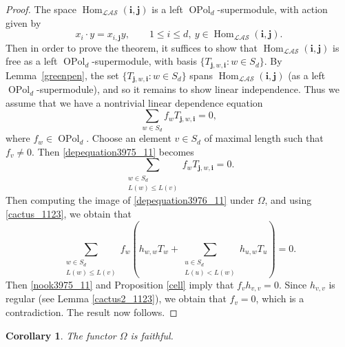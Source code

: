\documentclass[11pt]{amsart}
\newtheorem{cor}[theo]{Corollary}
\theoremstyle{definition}
\numberwithin{equation}{section}
\begin{document}
\begin{proof}
The space $ \operatorname{Hom}_{\mathcal{LAS}}(\mathbf{i}, \mathbf{j}) $ is a left $ \operatorname{OPol}_{d} $-supermodule, with action given by 
\begin{equation*}
x_{i} \cdot y = x_{i,\mathbf{j}}y, \qquad 1 \leq i \leq d, \ y \in  \operatorname{Hom}_{\mathcal{LAS}}(\mathbf{i}, \mathbf{j}).
\end{equation*}
Then in order to prove the theorem, it suffices to show that $ \operatorname{Hom}_{\mathcal{LAS}}(\mathbf{i}, \mathbf{j}) $ is free as a left $ \operatorname{OPol}_{d} $-supermodule, with basis $ \{T_{\mathbf{j},w,\mathbf{i}} : w \in S_{d}\} $. By Lemma~\ref{greenpen}, the set $ \{T_{\mathbf{j},w,\mathbf{i}} : w \in S_{d}\} $ spans $ \operatorname{Hom}_{\mathcal{LAS}}(\mathbf{i}, \mathbf{j}) $ (as a left $ \operatorname{OPol}_{d} $-supermodule), and so it remains to show linear independence. Thus we assume that we have a nontrivial linear dependence equation
\begin{equation} \label{depequation3975_11}
\sum_{w \in S_{d}} f_{w}T_{\mathbf{j},w,\mathbf{i}} = 0,
\end{equation}
where $ f_{w} \in \operatorname{OPol}_{d} $. Choose an element $ v \in S_{d} $ of maximal length such that $ f_{v} \neq 0 $. Then \cref{depequation3975_11} becomes
\begin{equation} \label{depequation3976_11}
\sum_{\substack{w \in S_{d} \\ L(w) \leq L(v)}} f_{w}T_{\mathbf{j},w,\mathbf{i}} = 0.
\end{equation}
Then computing the image of \cref{depequation3976_11} under $ \Omega $, and using \cref{cactus_1123}, we obtain that
\begin{equation} \label{nook3975_11}
\sum_{\substack{w \in S_{d} \\ L(w) \leq L(v)}} f_{w}\left( h_{w,w}T_{w} + \sum_{\substack{u \in S_{d} \\ L(u) < L(w)}} h_{u,w}T_{u}\right) = 0.
\end{equation}
Then \cref{nook3975_11} and Proposition \ref{cell} imply that $ f_{v}h_{v,v} = 0 $. Since $ h_{v,v} $ is regular (see Lemma \ref{cactus2_1123}), we obtain that $ f_{v} = 0 $, which is a contradiction. The result now follows.
\end{proof}

\begin{cor} \label{herd_Spin}
The functor $ \Omega $ is faithful.
\end{cor}
\end{document}
